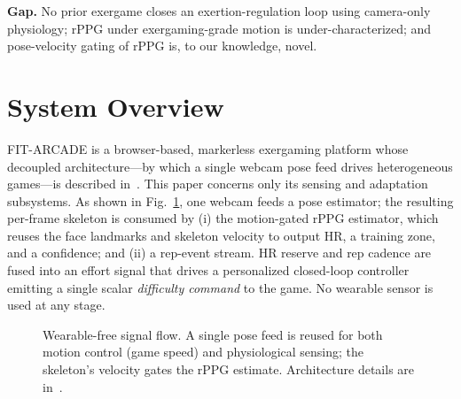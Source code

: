 \documentclass[journal,10pt]{IEEEtran}
\newcommand{\ssystem}{\textsc{FIT-ARCADE}}
\begin{document}
\textbf{Gap.} No prior exergame closes an exertion-regulation loop using
camera-only physiology; rPPG under exergaming-grade motion is under-characterized;
and pose-velocity gating of rPPG is, to our knowledge, novel.

\section{System Overview}\label{sec:overview}
\ssystem{} is a browser-based, markerless exergaming platform whose decoupled
architecture---by which a single webcam pose feed drives heterogeneous
games---is described in~\cite{fitarcade-sdps}. This paper concerns only its
sensing and adaptation subsystems. As shown in Fig.~\ref{fig:signalflow}, one
webcam feeds a pose estimator; the resulting per-frame skeleton is consumed by
(i) the motion-gated rPPG estimator, which reuses the face landmarks and skeleton
velocity to output HR, a training zone, and a confidence; and (ii) a rep-event
stream. HR reserve and rep cadence are fused into an effort signal that drives a
personalized closed-loop controller emitting a single scalar \emph{difficulty
command} to the game. No wearable sensor is used at any stage.

\begin{figure}[t]
\centering
{}
\caption{Wearable-free signal flow. A single pose feed is reused for both motion
control (game speed) and physiological sensing; the skeleton's velocity gates the
rPPG estimate. Architecture details are in~\cite{fitarcade-sdps}.}
\label{fig:signalflow}
\end{figure}
\end{document}
